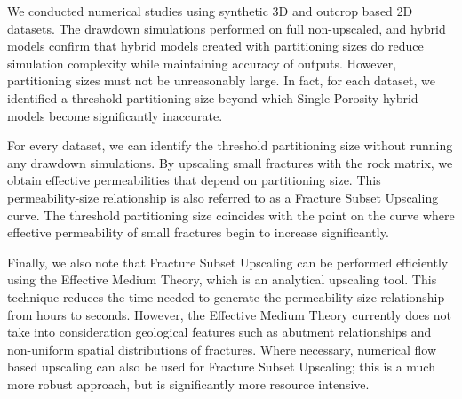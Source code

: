 \documentclass[draft]{agujournal2018}
\begin{document}
We conducted numerical studies using synthetic 3D and outcrop based 2D datasets. The drawdown simulations performed on full non-upscaled, and hybrid models confirm that hybrid models created with partitioning sizes do reduce simulation complexity while maintaining accuracy of outputs. However, partitioning sizes must not be unreasonably large. In fact, for each dataset, we identified a threshold partitioning size beyond which Single Porosity hybrid models become significantly inaccurate.

For every dataset, we can identify the threshold partitioning size without running any drawdown simulations. By upscaling small fractures with the rock matrix, we obtain effective permeabilities that depend on partitioning size. This permeability-size relationship is also referred to as a Fracture Subset Upscaling curve. The threshold partitioning size coincides with the point on the curve where effective permeability of small fractures begin to increase significantly. 

Finally, we also note that Fracture Subset Upscaling can be performed efficiently using the Effective Medium Theory, which is an analytical upscaling tool. This technique reduces the time needed to generate the permeability-size relationship from hours to seconds. However, the Effective Medium Theory currently does not take into consideration geological features such as abutment relationships and non-uniform spatial distributions of fractures. Where necessary, numerical flow based upscaling can also be used for Fracture Subset Upscaling; this is a much more robust approach, but is significantly more resource intensive.


\end{document}
